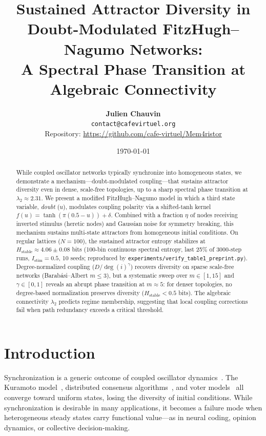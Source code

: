 \documentclass[11pt]{article}
\title{Sustained Attractor Diversity in Doubt-Modulated FitzHugh--Nagumo Networks:\\
A Spectral Phase Transition at Algebraic Connectivity}
\author{
    \textbf{Julien Chauvin} \\
    \small{\texttt{contact@cafevirtuel.org}} \\
    \small{Repository: \url{https://github.com/cafe-virtuel/Mem4ristor}}
}
\date{\today}
\begin{document}
\maketitle

\begin{abstract}
While coupled oscillator networks typically synchronize into homogeneous states, we demonstrate a mechanism---doubt-modulated coupling---that sustains attractor diversity even in dense, scale-free topologies, up to a sharp spectral phase transition at $\lambda_2 \approx 2.31$. We present a modified FitzHugh--Nagumo model in which a third state variable, \emph{doubt} ($u$), modulates coupling polarity via a shifted-tanh kernel $f(u) = \tanh(\pi(0.5-u)) + \delta$. Combined with a fraction $\eta$ of nodes receiving inverted stimulus (heretic nodes) and Gaussian noise for symmetry breaking, this mechanism sustains multi-state attractors from homogeneous initial conditions. On regular lattices ($N = 100$), the sustained attractor entropy stabilizes at $H_{\text{stable}} \approx 4.06 \pm 0.08$ bits (100-bin continuous spectral entropy, last 25\% of $3000$-step runs, $I_{\text{stim}}=0.5$, 10 seeds; reproduced by \texttt{experiments/verify\_table1\_preprint.py}). Degree-normalized coupling ($D/\deg(i)^\gamma$) recovers diversity on sparse scale-free networks (Barab\'asi--Albert $m \leq 3$), but a systematic sweep over $m \in [1, 15]$ and $\gamma \in [0, 1]$ reveals an abrupt phase transition at $m \approx 5$: for denser topologies, no degree-based normalization preserves diversity ($H_{\text{stable}} < 0.5$ bits). The algebraic connectivity $\lambda_2$ predicts regime membership, suggesting that local coupling corrections fail when path redundancy exceeds a critical threshold.
\end{abstract}

\section{Introduction}

Synchronization is a generic outcome of coupled oscillator dynamics~\cite{pikovsky2001,strogatz2000}. The Kuramoto model~\cite{acebrn2005}, distributed consensus algorithms~\cite{olfati2007}, and voter models~\cite{castellano2009} all converge toward uniform states, losing the diversity of initial conditions. While synchronization is desirable in many applications, it becomes a failure mode when heterogeneous steady states carry functional value---as in neural coding, opinion dynamics, or collective decision-making.
\end{document}
